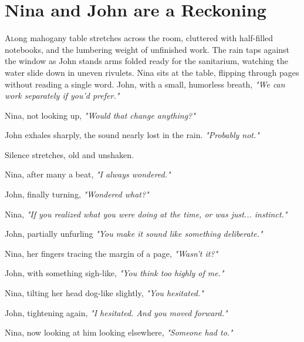 \section*{Nina and John are a Reckoning}

\lettrine{A} long mahogany table stretches across the room, cluttered with half-filled notebooks, and the lumbering weight of unfinished work. The rain taps against the window as John stands arms folded ready for the sanitarium, watching the water slide down in uneven rivulets. Nina sits at the table, flipping through pages without reading a single word. John, with a small, humorless breath, \textit{"We can work separately if you’d prefer."}  

Nina, not looking up, \textit{"Would that change anything?"}  

\smallskip

John exhales sharply, the sound nearly lost in the rain. \textit{"Probably not."}  

\smallskip

\noindent
Silence stretches, old and unshaken.  

\smallskip

Nina, after many a beat, \textit{"I always wondered."}  

\smallskip

John, finally turning, \textit{"Wondered what?"}  

\smallskip

Nina, \textit{"If you realized what you were doing at the time, or was just... instinct."}  

\smallskip

John, partially unfurling \textit{"You make it sound like something deliberate."}  

\smallskip

Nina, her fingers tracing the margin of a page,  \textit{"Wasn’t it?"}  

\smallskip

\noindent
John, with something sigh-like, \textit{"You think too highly of me."}  

\smallskip

Nina, tilting her head dog-like slightly, \textit{"You hesitated."}  

\smallskip

John, tightening again, \textit{"I hesitated. And you moved forward."}  

\smallskip

Nina, now looking at him looking elsewhere,  \textit{"Someone had to."}  

